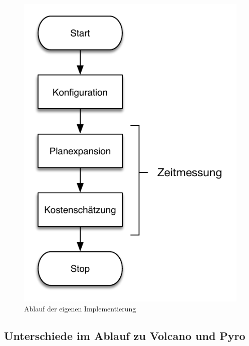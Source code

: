 \begin{figure}[h]
  \centering
  \includegraphics{04_Implementierung/Ablauf.pdf}
  \caption{Ablauf der eigenen Implementierung}
  \label{Ablauf}
\end{figure}


\subsection{Unterschiede im Ablauf zu Volcano und Pyro}